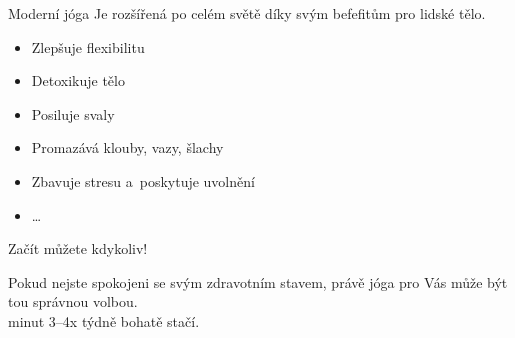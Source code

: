 \documentclass[pdf,slideColor,fyma]{beamer}
\begin{document}
\begin{frame}{Moderní jóga}
	Je rozšířená po celém světě díky svým befefitům pro lidské tělo.
	\medskip
	\begin{itemize}
		\item Zlepšuje flexibilitu
		\item Detoxikuje tělo
		\item Posiluje svaly
		\item Promazává klouby, vazy, šlachy
		\item Zbavuje stresu a~poskytuje uvolnění
		\item \dots
	\end{itemize}
\end{frame}
\begin{frame}{Začít můžete kdykoliv!}
	\begin{center}
    		Pokud nejste spokojeni se svým zdravotním stavem, právě jóga pro Vás může být tou správnou volbou. \\
    		 minut 3--4x týdně {\large{bohatě stačí}}.
    		\begin{center}
  		\end{center}   
  	\end{center} 
\end{frame}
\end{document}
